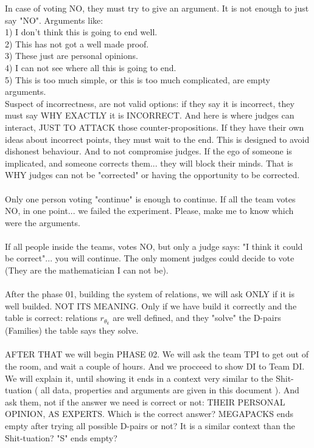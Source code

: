 		\noindent
		In case of voting NO, they must try to give an argument. It is not enough to just say "NO". Arguments like:\\
		1) I don't think this is going to end well.\\
		2) This has not got a well made proof.\\
		3) These just are personal opinions.\\
		4) I can not see where all this is going to end.\\
		5) This is too much simple, or this is too much complicated, are empty arguments.\\
		Suspect of incorrectness, are not valid options: if they say it is incorrect, they must say WHY EXACTLY it is INCORRECT. And here is where judges can interact, JUST TO ATTACK those counter-propositions. If they have their own ideas about incorrect points, they must wait to the end. This is designed to avoid dishonest behaviour. And to not compromise judges. If the ego of someone is implicated, and someone corrects them... they will block their minds. That is WHY judges can not be "corrected" or having the opportunity to be corrected.
		\\\\
		

		\noindent
		Only one person voting "continue" is enough to continue. If all the team votes NO, in one point... we failed the experiment. Please, make me to know which were the arguments.
		\\\\
		
		\noindent
		If all people inside the teams, votes NO, but only a judge says: "I think it could be correct"... you will continue. The only moment judges could decide to vote (They are the mathematician I can not be).
		\\\\
		
		\noindent
		After the phase 01, building the system of relations, we will ask ONLY if it is well builded. NOT ITS MEANING. Only if we have build it correctly and the table is correct: relations $r_{\theta_{k}}$ are well defined, and they "solve" the D-pairs (Families) the table says they solve.
		\\\\
		
		\noindent
		AFTER THAT we will begin PHASE 02. We will ask the team TPI to get out of the room, and wait a couple of hours. And we procceed to show DI to Team DI. We will explain it, until showing it ends in a context very similar to the Shit-tuation ( all data, properties and arguments are given in this document ). And ask them, not if the answer we need is correct or not: THEIR PERSONAL OPINION, AS EXPERTS. Which is the correct answer? MEGAPACKS ends empty after trying all possible D-pairs or not? It is a similar context than the Shit-tuation? "S" ends empty?
		\\\\
		
